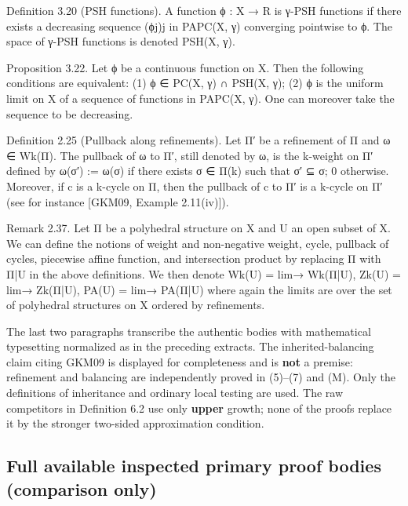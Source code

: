 \documentclass[
  11pt,
]{article}
\newenvironment{Shaded}{}{}
\newcommand{\NormalTok}[1]{#1}
\begin{document}
\begin{Shaded}
\begin{Highlighting}[]
\NormalTok{Definition 3.20 (PSH functions). A function ϕ : X → R is γ{-}PSH functions if there exists a}
\NormalTok{decreasing sequence (ϕj)j in PAPC(X, γ) converging pointwise to ϕ.}
\NormalTok{The space of γ{-}PSH functions is denoted PSH(X, γ).}

\NormalTok{Proposition 3.22. Let ϕ be a continuous function on X. Then the following conditions are}
\NormalTok{equivalent:}
\NormalTok{ (1) ϕ ∈ PC(X, γ) ∩ PSH(X, γ);}
\NormalTok{ (2) ϕ is the uniform limit on X of a sequence of functions in PAPC(X, γ). One can moreover}
\NormalTok{     take the sequence to be decreasing.}

\NormalTok{Definition 2.25 (Pullback along refinements). Let Π′ be a refinement of Π and ω ∈ Wk(Π).}
\NormalTok{The pullback of ω to Π′, still denoted by ω, is the k{-}weight on Π′ defined by}
\NormalTok{ ω(σ′) := ω(σ) if there exists σ ∈ Π(k) such that σ′ ⊆ σ; 0 otherwise.}
\NormalTok{Moreover, if c is a k{-}cycle on Π, then the pullback of c to Π′ is a k{-}cycle on Π′}
\NormalTok{(see for instance [GKM09, Example 2.11(iv)]).}

\NormalTok{Remark 2.37. Let Π be a polyhedral structure on X and U an open subset of X. We can define}
\NormalTok{the notions of weight and non{-}negative weight, cycle, pullback of cycles, piecewise affine function,}
\NormalTok{and intersection product by replacing Π with Π|U in the above definitions. We then denote}
\NormalTok{ Wk(U) = lim→ Wk(Π|U), Zk(U) = lim→ Zk(Π|U), PA(U) = lim→ PA(Π|U)}
\NormalTok{where again the limits are over the set of polyhedral structures on X ordered by refinements.}
\end{Highlighting}
\end{Shaded}

The last two paragraphs transcribe the authentic bodies with
mathematical typesetting normalized as in the preceding extracts. The
inherited-balancing claim citing GKM09 is displayed for completeness and
is \textbf{not} a premise: refinement and balancing are independently
proved in (5)--(7) and (M). Only the definitions of inheritance and
ordinary local testing are used. The raw competitors in Definition 6.2
use only \textbf{upper} growth; none of the proofs replace it by the
stronger two-sided approximation condition.

\subsection{Full available inspected primary proof bodies (comparison
only)}\label{full-available-inspected-primary-proof-bodies-comparison-only}
\end{document}
